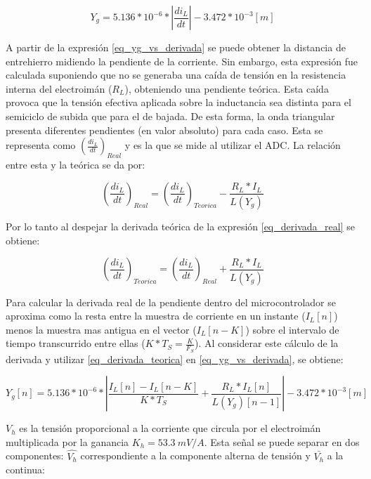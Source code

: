 \begin{equation} \label{eq_yg_vs_derivada}
	Y_g = 5.136*10^{-6}*|\frac{di_L}{dt}|- 3.472*10^{-3} [m]
\end{equation}

A partir de la expresión \ref{eq_yg_vs_derivada} se puede obtener la distancia de entrehierro midiendo la pendiente de la corriente. Sin embargo, esta expresión fue calculada suponiendo que no se generaba una caída de tensión en la resistencia interna del electroimán ($R_L$), obteniendo una pendiente teórica. Esta caída provoca que la tensión efectiva aplicada sobre la inductancia sea distinta para el semiciclo de subida que para el de bajada. De esta forma, la onda triangular presenta diferentes pendientes (en valor absoluto) para cada caso. Esta se representa como $(\frac{di_L}{dt})_{Real}$ y es la que se mide al utilizar el ADC. La relación entre esta y la teórica se da por:

\begin{equation} \label{eq_derivada_real}
	(\frac{di_L}{dt})_{Real}=(\frac{di_L}{dt})_{Teorica}-\frac{R_L*I_L}{L(Y_g)}
\end{equation}

Por lo tanto al despejar la derivada teórica de la expresión \ref{eq_derivada_real} se obtiene:

\begin{equation} \label{eq_derivada_teorica}
	(\frac{di_L}{dt})_{Teorica}=(\frac{di_L}{dt})_{Real}+\frac{R_L*I_L}{L(Y_g)}
\end{equation}


Para calcular la derivada real de la pendiente dentro del microcontrolador se aproxima como la resta entre la muestra de corriente en un instante ($I_L[n]$) menos la muestra mas antigua en el vector ($I_L[n-K]$) sobre el intervalo de tiempo transcurrido entre ellas ($K*T_S=\frac{K}{F_S}$). Al considerar este cálculo de la derivada y utilizar \ref{eq_derivada_teorica} en \ref{eq_yg_vs_derivada}, se obtiene:

\begin{equation} \label{eq_yg_vs_IL}
	Y_g[n] = 5.136*10^{-6}* |\frac{I_L[n]-I_L[n-K]}{K*T_S}+\frac{R_L*I_L[n]}{L(Y_g)[n-1]}| - 3.472*10^{-3} [m]
\end{equation}

$V_h$ es la tensión proporcional a la corriente que circula por el electroimán multiplicada por la ganancia $K_h=53.3\:mV/A$. Esta señal se puede separar en dos componentes: $\hat{V_h}$  correspondiente a la componente alterna de tensión y $\bar{V_h}$ a la continua:


